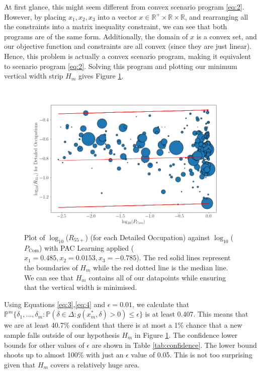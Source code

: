 \documentclass[11pt]{article}
\begin{document}
At first glance, this might seem different from convex scenario program \ref{eq:2}. However, by placing $x_{1},x_{2},x_{3}$ into a vector $x \in \mathbb{R}^{+} \times \mathbb{R} \times \mathbb{R}$, and rearranging all the constraints into a matrix inequality constraint, we can see that both programs are of the same form. Additionally, the domain of $x$ is a convex set, and our objective function and constraints are all convex (since they are just linear). Hence, this problem is actually a convex scenario program, making it equivalent to scenario program \ref{eq:2}. Solving this program and plotting our minimum vertical width strip $H_{m}$ gives Figure \ref{fig:pac}.


\begin{figure}[!htb]
	\centering
	\includegraphics[width=15cm]{Figures/pac2.png}
	\caption{Plot of $\log_{10}$($R_{55+}$) (for each Detailed Occupation) against $\log_{10}$($P_{\text{Com}}$) with PAC Learning applied ($x_{1}=0.485, x_{2}=0.0153, x_{3}=-0.785$). The red solid lines represent the boundaries of $H_{m}$ while the red dotted line is the median line. We can see that $H_{m}$ contains all of our datapoints while ensuring that the vertical width is minimised.}
	\label{fig:pac}
\end{figure}

Using Equations \ref{eq:3},\ref{eq:4} and $\epsilon=0.01$, we calculate that $\mathbb{P}^{m} \{\delta_{1},...,\delta_{m}: \mathbb{P}(\delta \in \Delta: g(x^{*}_{m},\delta) > 0) \leq \epsilon \}$ is at least 0.407. This means that we are at least 40.7\% confident that there is at most a 1\% chance that a new sample falls outside of our hypothesis $H_{m}$ in Figure \ref{fig:pac}. The confidence lower bounds for other values of $\epsilon$ are shown in Table \ref{tab:confidence}. The lower bound shoots up to almost 100\% with just an $\epsilon$ value of 0.05. This is not too surprising given that $H_{m}$ covers a relatively huge area.
\end{document}
